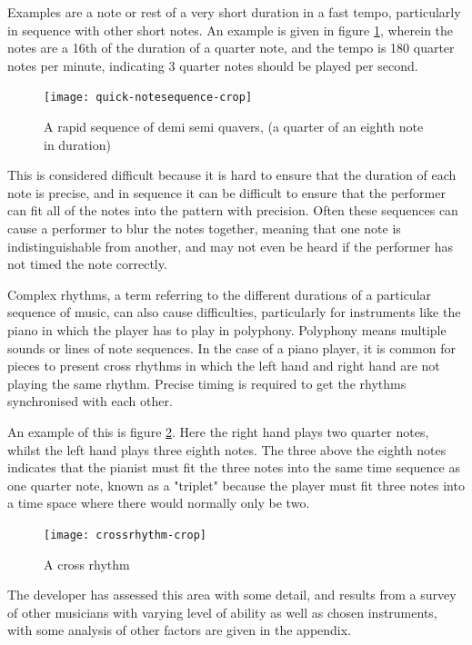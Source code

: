 Examples are a note or rest of a very short duration in a fast tempo, particularly in sequence with other short notes. An example is given in figure \ref{fig:notesequence}, wherein the notes are a 16th of the duration of a quarter note, and the tempo is 180 quarter notes per minute, indicating 3 quarter notes should be played per second.

\begin{figure}[H]
\centering
\texttt{[image: quick-notesequence-crop]}
\caption{A rapid sequence of demi semi quavers, (a quarter of an eighth note in duration)}
\label{fig:notesequence}	
\end{figure}

 This is considered difficult because it is hard to ensure that the duration of each note is precise, and in sequence it can be difficult to ensure that the performer can fit all of the notes into the pattern with precision. Often these sequences can cause a performer to blur the notes together, meaning that one note is indistinguishable from another, and may not even be heard if the performer has not timed the note correctly.

Complex rhythms, a term referring to the different durations of a particular sequence of music, can also cause difficulties, particularly for instruments like the piano in which the player has to play in polyphony. Polyphony means multiple sounds or lines of note sequences. In the case of a piano player, it is common for pieces to present cross rhythms in which the left hand and right hand are not playing the same rhythm. Precise timing is required to get the rhythms synchronised with each other. 

An example of this is figure \ref{fig:crossrhythms}. Here the right hand plays two quarter notes, whilst the left hand plays three eighth notes. The three above the eighth notes indicates that the pianist must fit the three notes into the same time sequence as one quarter note, known as a "triplet" because the player must fit three notes into a time space where there would normally only be two.

\begin{figure}[H]
\centering
\texttt{[image: crossrhythm-crop]}
\caption{A cross rhythm}
\label{fig:crossrhythms}	
\end{figure}

The developer has assessed this area with some detail, and results from a survey of other musicians with varying level of ability as well as chosen instruments, with some analysis of other factors are given in the appendix.

